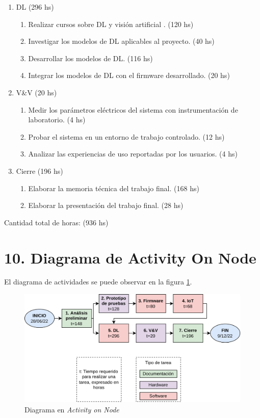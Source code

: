\documentclass[
11pt, %
]{plan}
\begin{document}
\begin{enumerate}
\item DL (296 hs)
	\begin{enumerate}
		\item Realizar cursos sobre DL y visión artificial
. (120 hs)
		\item Investigar los modelos de DL aplicables al proyecto. (40 hs)
		\item Desarrollar los modelos de DL. (116 hs)
		\item Integrar los modelos de DL con el firmware desarrollado. (20 hs)
	\end{enumerate}

\item V\&V (20 hs)
	\begin{enumerate}
		\item Medir los parámetros eléctricos del sistema con instrumentación de laboratorio. (4 hs)
		\item Probar el sistema en un entorno de trabajo controlado. (12 hs)
		\item Analizar las experiencias de uso reportadas por los usuarios. (4 hs)
	\end{enumerate}
	
\item Cierre (196 hs)
	\begin{enumerate}
		\item Elaborar la memoria técnica del trabajo final. (168 hs)
		\item Elaborar la presentación del trabajo final. (28 hs)
	\end{enumerate}
\end{enumerate}

Cantidad total de horas: (936 hs)

\section{10. Diagrama de Activity On Node}
\label{sec:AoN}

El diagrama de actividades se puede observar en la figura \ref{fig:AoN}.

\begin{figure}[htpb]
\centering
\includegraphics[width=.8\textwidth]{./fig/AoN.png}
\caption{Diagrama en \textit{Activity on Node}}
\label{fig:AoN}
\end{figure}
\end{document}
